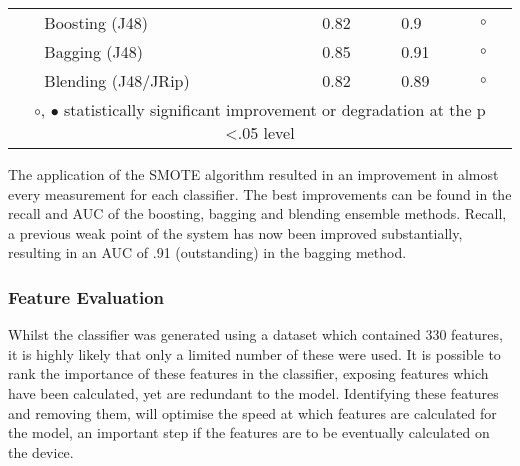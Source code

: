 \begin{table}[ph]
\begin{tabular}{@{}lllll@{}}
                           & Boosting (J48)      & 0.82  & 0.9                                                     & $\circ$ \\
                           & Bagging  (J48)      & 0.85  & 0.91                                                    & $\circ$ \\
                           & Blending (J48/JRip) & 0.82  & 0.89                                                    & $\circ$ \\ \midrule
\multicolumn{5}{c}{$\circ$, $\bullet$ statistically significant improvement or degradation at the p \textless .05 level} \\ \bottomrule
\end{tabular}
\end{table}

The application of the SMOTE algorithm resulted in an improvement in almost every measurement for each classifier. The best improvements can be found in the recall and AUC of the boosting, bagging and blending ensemble methods. Recall, a previous weak point of the system has now been improved substantially, resulting in an AUC of .91 (outstanding) in the bagging method.

\subsubsection{Feature Evaluation}
Whilst the classifier was generated using a dataset which contained 330 features, it is highly likely that only a limited number of these were used. It is possible to rank the importance of these features in the classifier, exposing features which have been calculated, yet are redundant to the model. Identifying these features and removing them, will optimise the speed at which features are calculated for the model, an important step if the features are to be eventually calculated on the device.

